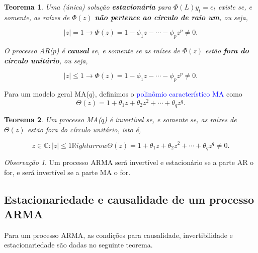 \documentclass[
]{book}
\newtheorem{theorem}{Teorema}[chapter]
\theoremstyle{definition}
\theoremstyle{definition}
\theoremstyle{definition}
\theoremstyle{remark}
\newtheorem*{remark}{Observação}
\begin{document}
\begin{theorem}
\protect\hypertarget{thm:soluest}{}{\label{thm:soluest} }Uma (única) solução \textbf{estacionária} para \(\Phi(L)y_t = e_t\) existe se, e somente, as raízes de \(\Phi(z)\) \textbf{não pertence ao círculo de raio um}, ou seja,

\begin{equation*}
|z| = 1 \rightarrow \Phi(z) = 1 - \phi_1 z - \cdots - \phi_p z^p \neq 0.
\end{equation*}

O processo AR(\(p\)) é \textbf{causal} se, e somente se as raízes de \(\Phi(z)\) estão \textbf{fora do círculo unitário}, ou seja,

\[
|z| \leq 1 \rightarrow \Phi(z) = 1 - \phi_1 z - \cdots - \phi_p z^p \neq 0.
\]
\end{theorem}

Para um modelo geral MA(\(q\)), definimos o \textcolor{blue}{ polinômio característico MA } como
\begin{equation*}
\Theta(z) = 1 + \theta_1 z +\theta_2 z^2+\cdots+\theta_q z^q.
\end{equation*}

\begin{theorem}
\protect\hypertarget{thm:invert}{}{\label{thm:invert} }Um processo MA(\(q\)) é invertível se, e somente se, as raízes de \(\Theta(z)\) estão fora do círculo
unitário, isto é,

\begin{equation*}
z\in\mathbb{C} : |z|\leq  1 \mathbb{R}ightarrow \Theta(z) = 1 + \theta_1 z +\theta_2 z^2+\cdots+\theta_q z^q\neq 0.
\end{equation*}
\end{theorem}

\begin{remark}
{}Um processo ARMA será invertível e estacionário se a parte AR o for, e será invertível se a parte MA o for.
\end{remark}

\hypertarget{estacionariedade-e-causalidade-de-um-processo-arma}{%
\subsection{Estacionariedade e causalidade de um processo ARMA}\label{estacionariedade-e-causalidade-de-um-processo-arma}}

Para um processo ARMA, as condições para causalidade, invertibilidade e estacionariedade são dadas no seguinte teorema.
\end{document}

